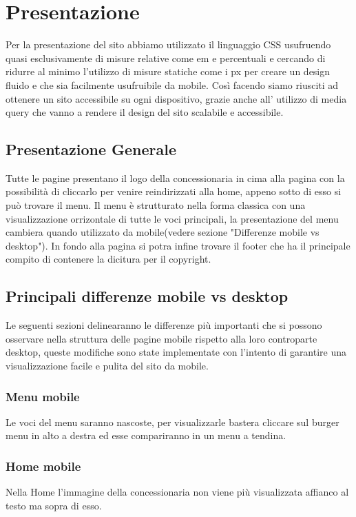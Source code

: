 \section{Presentazione}
    Per la presentazione del sito abbiamo utilizzato il linguaggio CSS usufruendo quasi esclusivamente di misure relative come em e percentuali e cercando di ridurre al minimo l'utilizzo di misure statiche come i px per creare un design fluido e che sia facilmente usufruibile da mobile.
    Così facendo siamo riusciti ad ottenere un sito accessibile su ogni dispositivo, grazie anche all' utilizzo di media query che vanno a rendere il design del sito scalabile e accessibile.
    
    \subsection{Presentazione Generale}
    Tutte le pagine presentano il logo della concessionaria in cima alla pagina con la possibilità di cliccarlo per venire reindirizzati alla home, appeno sotto di esso si può trovare il menu. Il menu è strutturato nella forma classica con una visualizzazione orrizontale di tutte le voci principali, la presentazione del menu cambiera quando utilizzato da mobile(vedere sezione "Differenze mobile vs desktop"). In fondo alla pagina si potra infine trovare il footer che ha il principale compito di contenere la dicitura per il copyright.

    \subsection{Principali differenze mobile vs desktop}
    Le seguenti sezioni delinearanno le differenze più importanti che si possono osservare nella struttura delle pagine mobile rispetto alla loro controparte desktop, queste modifiche sono state implementate con l'intento di garantire una visualizzazione facile e pulita del sito da mobile.

        \subsubsection{Menu mobile}
        Le voci del menu saranno nascoste, per visualizzarle bastera cliccare sul burger menu in alto a destra ed esse compariranno in un menu a tendina.

        \subsubsection{Home mobile}
        Nella Home l'immagine della concessionaria non viene più visualizzata affianco al testo ma sopra di esso.


